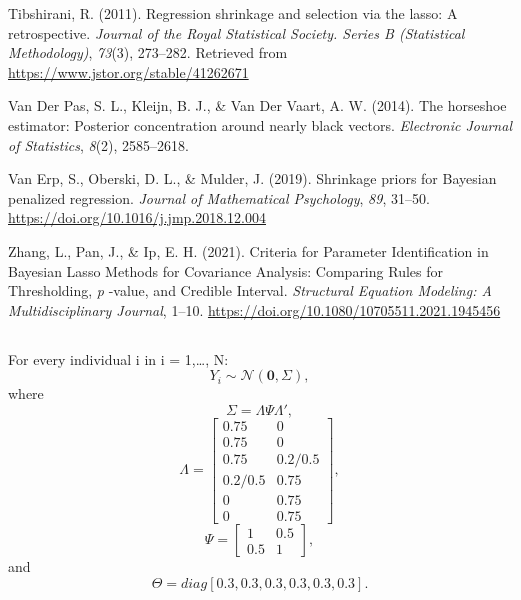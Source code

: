 \documentclass[
  english,
  man, donotrepeattitle,floatsintext]{apa6}
\newlength{\cslhangindent}
\newlength{\cslentryspacingunit} %
\newenvironment{CSLReferences}[2] %
 {%
  \setlength{\parindent}{0pt}
  \ifodd #1
  \let\oldpar\par
  \def\par{\hangindent=\cslhangindent\oldpar}
  \fi
  \setlength{\parskip}{#2\cslentryspacingunit}
 }%
 {}
\begin{document}
\begin{CSLReferences}{1}{0}
\leavevmode{}%
Tibshirani, R. (2011). Regression shrinkage and selection via the lasso: A retrospective. \emph{Journal of the Royal Statistical Society. Series B (Statistical Methodology)}, \emph{73}(3), 273--282. Retrieved from \url{https://www.jstor.org/stable/41262671}

\leavevmode{}%
Van Der Pas, S. L., Kleijn, B. J., \& Van Der Vaart, A. W. (2014). The horseshoe estimator: {Posterior} concentration around nearly black vectors. \emph{Electronic Journal of Statistics}, \emph{8}(2), 2585--2618.

\leavevmode{}%
Van Erp, S., Oberski, D. L., \& Mulder, J. (2019). Shrinkage priors for {Bayesian} penalized regression. \emph{Journal of Mathematical Psychology}, \emph{89}, 31--50. \url{https://doi.org/10.1016/j.jmp.2018.12.004}

\leavevmode{}%
Zhang, L., Pan, J., \& Ip, E. H. (2021). Criteria for {Parameter} {Identification} in {Bayesian} {Lasso} {Methods} for {Covariance} {Analysis}: {Comparing} {Rules} for {Thresholding}, \emph{p} -value, and {Credible} {Interval}. \emph{Structural Equation Modeling: A Multidisciplinary Journal}, 1--10. \url{https://doi.org/10.1080/10705511.2021.1945456}

\end{CSLReferences}

\endgroup


\clearpage
\makeatletter
\efloat@restorefloats
\makeatother


\begin{appendix}
\section{}
For every individual i in i = 1,\ldots, N:
\[Y_i \sim \mathcal{N}(\mathbf{0}, \Sigma),\] where
\[\Sigma = \Lambda\Psi\Lambda',\] \[\Lambda = 
\begin{bmatrix}
0.75 & 0 \\
0.75 & 0 \\
0.75 & 0.2/0.5 \\
0.2/0.5 & 0.75 \\
0 & 0.75 \\
0 & 0.75
\end{bmatrix},\] \[\Psi =
\begin{bmatrix}
1 & 0.5 \\
0.5 & 1
\end{bmatrix}
,\] and \[\Theta = diag[0.3, 0.3, 0.3, 0.3, 0.3, 0.3].\]
\end{appendix}
\end{document}
